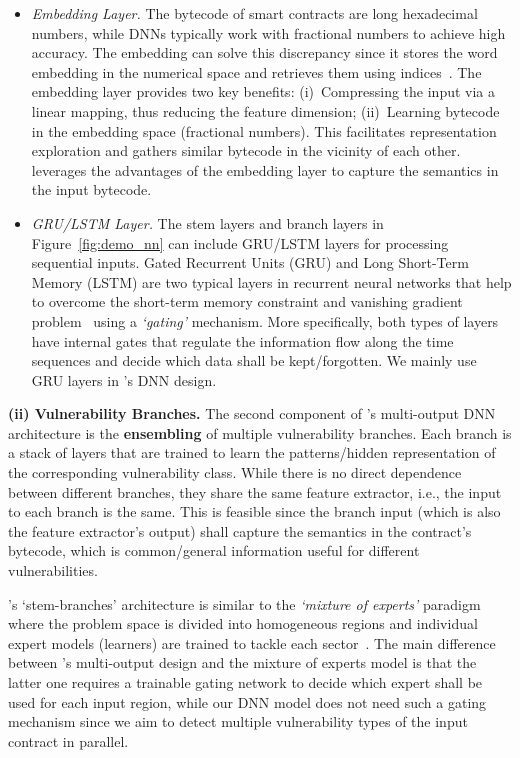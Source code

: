 \begin{itemize}
    \item \textit{Embedding Layer.} The bytecode of smart contracts are long hexadecimal numbers, while DNNs typically work with fractional numbers to achieve high accuracy. The embedding can solve this discrepancy since it stores the word embedding in the numerical space and retrieves them using indices~\cite{zamani2017relevance}.
    The embedding layer provides two key benefits: (i)~Compressing the input via a linear mapping, thus reducing the feature dimension; (ii)~Learning bytecode in the embedding space (fractional numbers). This facilitates representation exploration and gathers similar bytecode in the vicinity of each other. 
    \sys{} leverages the advantages of the embedding layer to capture the semantics in the input bytecode. 
    
    \vspace{0.3em}
    \item \textit{GRU/LSTM Layer.} The stem layers and branch layers in Figure~\ref{fig:demo_nn} can include GRU/LSTM layers for processing sequential inputs. 
    Gated Recurrent Units (GRU) and Long Short-Term Memory (LSTM) are two typical layers in recurrent neural networks that help to overcome the short-term memory constraint and vanishing gradient problem~\cite{kim2017residual} using a \textit{`gating'} mechanism. 
    More specifically, both types of layers have internal gates that regulate the information flow along the time sequences and decide which data shall be kept/forgotten. 
    We mainly use GRU layers in \sys{}'s DNN design. 
\end{itemize}

\textbf{(ii) Vulnerability Branches.} 
The second component of \sys{}'s multi-output DNN architecture is the \textbf{ensembling} of multiple vulnerability branches. Each branch is a stack of layers that are trained to learn the patterns/hidden representation of the corresponding vulnerability class. 
While there is no direct dependence between different branches, they share the same feature extractor, i.e., the input to each branch is the same. 
This is feasible since the branch input (which is also the feature extractor's output) shall capture the semantics in the contract's bytecode, which is common/general information useful for different vulnerabilities. 

\sys{}'s `stem-branches' architecture is similar to the \textit{`mixture of experts'} paradigm where the problem space is divided into homogeneous regions and individual expert models (learners) are trained to tackle each sector~\cite{kiyono2019mixture}. 
The main difference between \sys{}'s multi-output design and the mixture of experts model is that the latter one requires a trainable gating network to decide which expert shall be used for each input region, while our DNN model does not need such a gating mechanism since we aim to detect multiple vulnerability types of the input contract in parallel.  

